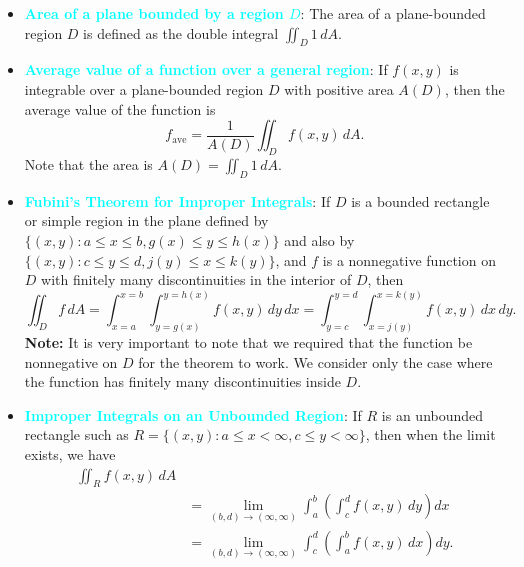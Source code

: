 \documentclass{report}
\begin{document}
\begin{itemize}
        \item \textbf{\textcolor{cyan}{Area of a plane bounded by a region $D$}}:
            The area of a plane-bounded region \(D\) is defined as the double integral \(\iint_{D} 1 \, dA\).
        \item \textbf{\textcolor{cyan}{Average value of a function over a general region}}:
            If \(f(x,y)\) is integrable over a plane-bounded region \(D\) with positive area \(A(D)\), then the average value of the function is
            \[
                f_{\text{ave}} = \frac{1}{A(D)} \iint_{D} f(x,y) \, dA.
            \]
            Note that the area is \(A(D) = \iint_{D} 1 \, dA\).
        \item \textbf{\textcolor{cyan}{Fubini’s Theorem for Improper Integrals}}:
            If $D$ is a bounded rectangle or simple region in the plane defined by $\{(x,y) : a \leq x \leq b, g(x) \leq y \leq h(x)\}$ and also by $\{(x,y) : c \leq y \leq d, j(y) \leq x \leq k(y)\}$, and $f$ is a nonnegative function on $D$ with finitely many discontinuities in the interior of $D$, then
            \[
                \iint_D f \, dA = \int_{x=a}^{x=b} \int_{y=g(x)}^{y=h(x)} f(x,y) \, dy \, dx = \int_{y=c}^{y=d} \int_{x=j(y)}^{x=k(y)} f(x,y) \, dx \, dy.
            \]
            \bigbreak \noindent 
            \textbf{Note:} It is very important to note that we required that the function be nonnegative on  $D$ for the theorem to work. We consider only the case where the function has finitely many discontinuities inside $D$.
        \item \textbf{\textcolor{cyan}{Improper Integrals on an Unbounded Region}}:
            If $R$ is an unbounded rectangle such as $R = \{(x,y) : a \leq x < \infty, c \leq y < \infty\}$, then when the limit exists, we have
            \begin{align*}
                \iint_R f(x,y) \, dA  &\\
                &= \lim_{(b,d) \to (\infty, \infty)} \int_a^b \left( \int_c^d f(x,y) \, dy \right) dx  \\
                &= \lim_{(b,d) \to (\infty, \infty)} \int_c^d \left( \int_a^b f(x,y) \, dx \right) dy
            .\end{align*}


\end{itemize}
\end{document}
